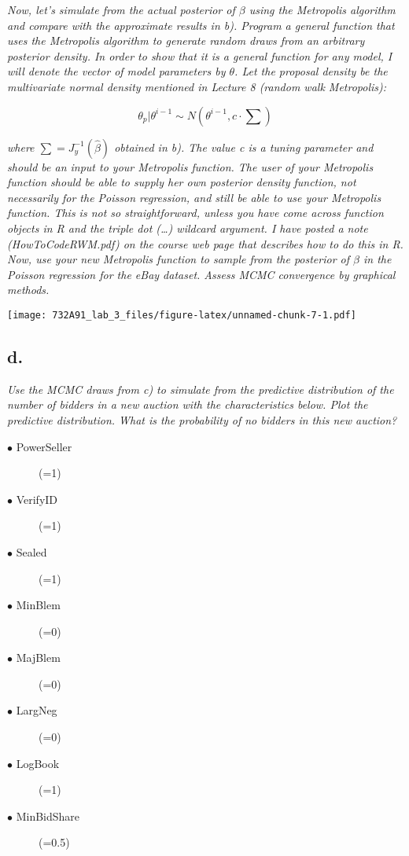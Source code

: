 \documentclass[]{article}
\begin{document}
\emph{Now, let's simulate from the actual posterior of \(\beta\) using
the Metropolis algorithm and compare with the approximate results in b).
Program a general function that uses the Metropolis algorithm to
generate random draws from an arbitrary posterior density. In order to
show that it is a general function for any model, I will denote the
vector of model parameters by \(\theta\). Let the proposal density be
the multivariate normal density mentioned in Lecture 8 (random walk
Metropolis):}

\[\theta_p|\theta^{i-1}\sim N(\theta^{i-1},c\cdot \sum)\]

\emph{where \(\sum = J_y^{-1}(\hat\beta)\) obtained in b). The value c
is a tuning parameter and should be an input to your Metropolis
function. The user of your Metropolis function should be able to supply
her own posterior density function, not necessarily for the Poisson
regression, and still be able to use your Metropolis function. This is
not so straightforward, unless you have come across function objects in
R and the triple dot (\ldots) wildcard argument. I have posted a note
(HowToCodeRWM.pdf) on the course web page that describes how to do this
in R. Now, use your new Metropolis function to sample from the posterior
of \(\beta\) in the Poisson regression for the eBay dataset. Assess MCMC
convergence by graphical methods.}

\texttt{[image: 732A91\_lab\_3\_files/figure-latex/unnamed-chunk-7-1.pdf]}

\hypertarget{d.}{%
\subsection{d.}\label{d.}}

\emph{Use the MCMC draws from c) to simulate from the predictive
distribution of the number of bidders in a new auction with the
characteristics below. Plot the predictive distribution. What is the
probability of no bidders in this new auction?}

\begin{description}
\item[$\bullet$ PowerSeller] (=1)
\item[$\bullet$ VerifyID] (=1)
\item[$\bullet$ Sealed] (=1)
\item[$\bullet$ MinBlem] (=0)
\item[$\bullet$ MajBlem] (=0)
\item[$\bullet$ LargNeg] (=0)
\item[$\bullet$ LogBook] (=1)
\item[$\bullet$ MinBidShare] (=0.5)
\end{description}
\end{document}
